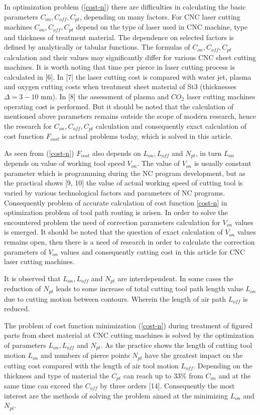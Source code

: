 \documentclass[runningheads]{llncs}
\begin{document}
In optimization problem (\ref{cost-n})
there are difficulties in calculating the basic parameters
$C_{on}, C_{off}, C_{pt}$,
depending on many factors.
For CNC laser cutting machines $C_{on}, C_{off}, C_{pt}$
depend on the type of laser used in CNC machine,
type and thickness of treatment material.
The dependence on selected factors is defined by analytically or tabular functions.
The formulas of $C_{on}, C_{off}, C_{pt}$
calculation and their values may significantly differ for various CNC sheet cutting machines.
It is worth noting that time per pierce in laser cutting process is calculated in [6].
In [7] the laser cutting cost is compared with water jet,
plasma and oxygen cutting costs when treatment sheet material of St3
(thicknesses $\Delta=3-10$ mm).
In [8] the assessment of plasma and $CO_2$ laser cutting machines operating cost is performed.
But it should be noted that the calculation of mentioned above parameters
remains outside the scope of modern research,
hence the research for $C_{on}, C_{off}, C_{pt}$
calculation and consequently exact calculation of cost function $F_{cost}$
is actual problems today, which is solved in this article.

As seen from (\ref{cost-n})
$F_{cost}$
also depends on
$L_{on}, L_{off}$ and $N_{pt}$,
in turn $L_{on}$ depends on value of working tool speed $V_{on}$.
The value of $V_{on}$ is usually constant parameter
which is programming during the NC program development,
but as the practical shows [9, 10]
the value of actual working speed of cutting tool
is varied by various technological factors and parameters of NC programs.
Consequently problem of accurate calculation of cost function \ref{cost-n}
in optimization problem of tool path routing is arisen.
In order to solve the encountered problem
the need of correction parameters calculation for $V_{on}$
values is emerged.
It should be noted that
the question of exact calculation of  $V_{on}$ values remains open,
then there is a need of research in order to calculate the correction parameters of  $V_{on}$
values and consequently cutting cost in this article for CNC laser cutting machines.

It is observed that $L_{on}, L_{off}$ and $N_{pt}$
are interdependent.
In some cases the reduction of  $N_{pt}$
leads to some increase of total cutting tool path length value $L_{on}$
due to cutting motion between contours.
Wherein the length of air path $L_{off}$ is reduced.

The problem of cost function minimization (\ref{cost-n})
during treatment of figured parts from sheet material
at CNC cutting machines is solved by the optimization of parameters
$L_{on}, L_{off}$ and $N_{pt}$.
As the practice shows the length of cutting tool motion  $L_{on}$
and numbers of pierce points $N_{pt}$
have the greatest impact on the cutting cost compared with the length of air tool motion $L_{off}$.
Depending on the thickness and type of material the $C_{pt}$
can reach up to 33\% from $C_{on}$
and at the same time can exceed the $C_{off}$
by three orders [14].
Consequently the most interest are the methods of solving the problem aimed at the minimizing
$L_{on}$ and $N_{pt}$.
\end{document}
